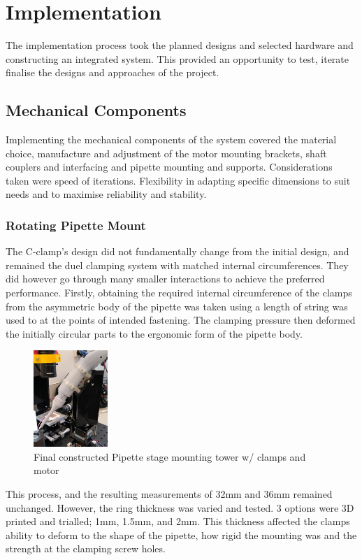 \chapter{Implementation}\label{C:imp}
The implementation process took the planned designs and selected hardware and constructing an integrated system. This provided an opportunity to test, iterate finalise the designs and approaches of the project.      

\section{Mechanical Components}
Implementing the mechanical components of the system covered the material choice, manufacture and adjustment of the motor mounting brackets, shaft couplers and interfacing and pipette mounting and supports. Considerations taken were speed of iterations. Flexibility in adapting specific dimensions to suit needs and to maximise reliability and stability. 

\subsection{Rotating Pipette Mount}
The C-clamp's design did not fundamentally change from the initial design, and remained the duel clamping system with matched internal circumferences. They did however go through many smaller interactions to achieve the preferred performance. Firstly, obtaining the required internal circumference of the clamps from the asymmetric body of the pipette was taken using a length of string was used to at the points of intended fastening. The clamping pressure then deformed the initially circular parts to the ergonomic form of the pipette body.

\begin{figure}
    \includegraphics[width=0.25\textwidth]{img/r_pip.jpg}
    \caption{Final constructed Pipette stage mounting tower w/ clamps and motor}
\end{figure}

This process, and the resulting measurements of 32mm and 36mm remained unchanged.
However, the ring thickness was varied and tested. 3 options were 3D printed and trialled; 1mm, 1.5mm, and 2mm. This thickness affected the clamps ability to deform to the shape of the pipette, how rigid the mounting was and the strength at the clamping screw holes.


